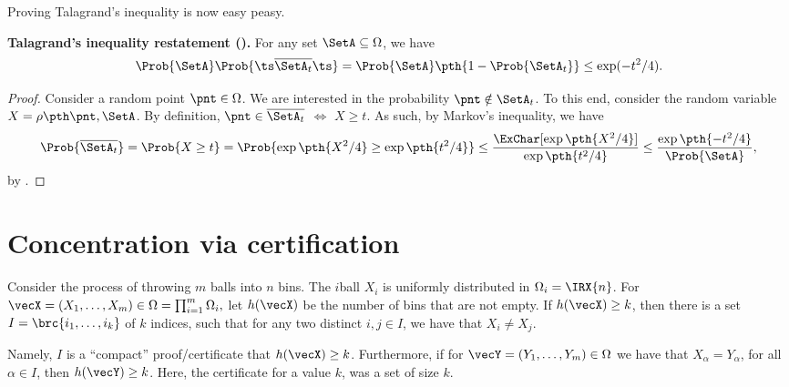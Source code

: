 Proving Talagrand's inequality is now easy \si{peasy}.

\bigskip%
\noindent
\textbf{Talagrand's inequality restatement
   ().}
% 
    For any set $\SetA \subseteq \Omega$, we have
    \begin{equation*}
        \Prob{\SetA}\Prob{ \ts \smash{\overline{\SetA_t}}\ts }%
        =%
        \Prob{\SetA}\pth{\bigl. 1 - \Prob{ \SetA_t} } \leq %
        \exp( -t^2 /4).
    \end{equation*}%

\begin{proof}
    Consider a random point $\pnt \in \Omega$. We are interested in
    the probability $ \pnt \notin \SetA_t$. To this end, consider the
    random variable $X = \distTY{\pnt}{\SetA}$. By definition,
    $\pnt \in \overline{\SetA_t}$ $\iff$ $X \geq t$. As such, by
    Markov's inequality, we have
    \begin{equation*}
        \Prob{\overline{\SetA_t}} %
        =%
        \Prob{X \geq t}%
        =%
        \Prob{\exp\pth{X^2/4} \geq \exp\pth{t^2/4}}%
        \leq%
        \frac{\ExChar [ \exp\pth{X^2/4} ] }{\exp\pth{t^2/4}}%
        \leq%
        \frac{\exp\pth{-t^2/4}}{\Prob{\SetA}},
    \end{equation*}
    by .   
\end{proof}



\section{Concentration via certification}



\begin{example}
    Consider the process of throwing $m$ balls into $n$ bins. The
    $i$\th ball $X_i$ is uniformly distributed in
    $\Omega_i = \IRX{n}$. For
    \begin{math}
        \vecX = (X_1, \ldots, X_m) \in \Omega = \prod_{i=1}^m
        \Omega_i,
    \end{math}
    let $h(\vecX)$ be the number of bins that are not empty.  If
    $h(\vecX) \geq k$, then there is a set
    $I = \brc{i_1, \ldots, i_k}$ of $k$ indices, such that for any two
    distinct $i,j \in I$, we have that $X_i \neq X_j$.

    Namely, $I$ is a ``compact'' proof/certificate that
    $h( \vecX ) \geq k$. Furthermore, if for
    $\vecY = (Y_1, \ldots, Y_m) \in \Omega$ we have that
    $X_{\alpha} = Y_{\alpha}$, for all $\alpha \in I$, then
    $h( \vecY ) \geq k$.  Here, the certificate for a value $k$, was a
    set of size $k$.
\end{example}


